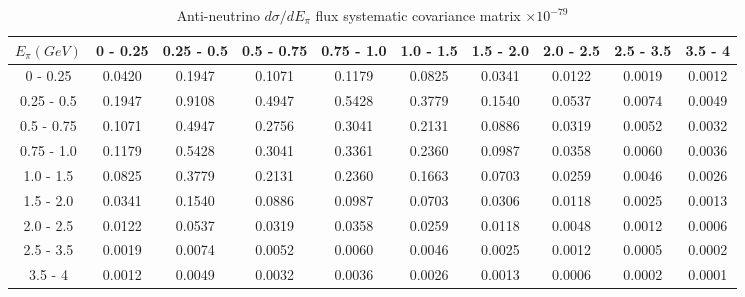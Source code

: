 \documentclass[aps,prl,twocolumn,showpacs,superscriptaddress,nofootinbib]{revtex4}
\begin{document}
\begingroup
\squeezetable
\begin{table}[h]
\tabcolsep=0.11cm
\begin{tabular}{c|ccccccccc}
$E_{\pi}(GeV)$ & 0 - 0.25 & 0.25 - 0.5 & 0.5 - 0.75 & 0.75 - 1.0 & 1.0 - 1.5 & 1.5 - 2.0 & 2.0 - 2.5 & 2.5 - 3.5 & 3.5 - 4 \\
\hline
0 - 0.25 &0.0420	&0.1947	&0.1071	&0.1179	&0.0825	&0.0341	&0.0122	&0.0019	&0.0012	\\
0.25 - 0.5 &0.1947	&0.9108	&0.4947	&0.5428	&0.3779	&0.1540	&0.0537	&0.0074	&0.0049	\\
0.5 - 0.75 &0.1071	&0.4947	&0.2756	&0.3041	&0.2131	&0.0886	&0.0319	&0.0052	&0.0032	\\
0.75 - 1.0 &0.1179	&0.5428	&0.3041	&0.3361	&0.2360	&0.0987	&0.0358	&0.0060	&0.0036	\\
1.0 - 1.5 &0.0825	&0.3779	&0.2131	&0.2360	&0.1663	&0.0703	&0.0259	&0.0046	&0.0026	\\
1.5 - 2.0 &0.0341	&0.1540	&0.0886	&0.0987	&0.0703	&0.0306	&0.0118	&0.0025	&0.0013	\\
2.0 - 2.5 &0.0122	&0.0537	&0.0319	&0.0358	&0.0259	&0.0118	&0.0048	&0.0012	&0.0006	\\
2.5 - 3.5 &0.0019	&0.0074	&0.0052	&0.0060	&0.0046	&0.0025	&0.0012	&0.0005	&0.0002	\\
3.5 - 4 &0.0012	&0.0049	&0.0032	&0.0036	&0.0026	&0.0013	&0.0006	&0.0002	&0.0001\\	
 
\end{tabular}
\caption{Anti-neutrino $d\sigma/dE_\pi$ flux systematic covariance matrix  $\times 10^{-79}$ }
\label{tab:epiB-flux}
\end{table}
\endgroup
\end{document}

